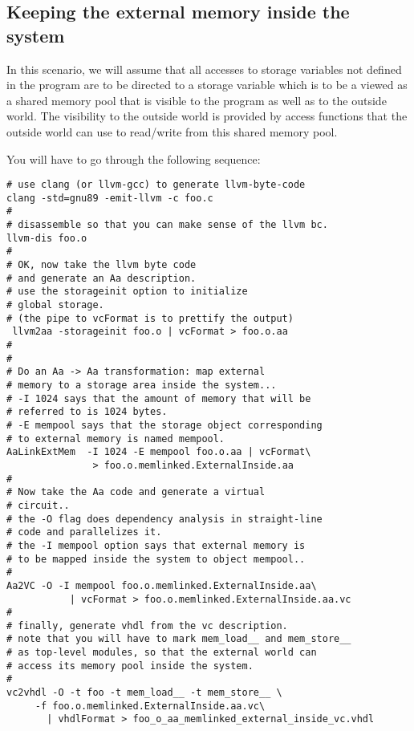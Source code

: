 \subsection{Keeping the external memory inside the system}

In this scenario, we will assume that all accesses to 
storage variables not defined in the \Aa program are 
to be directed to a storage variable which is to be
a viewed as a shared memory pool that is visible to the
\Aa program as well as to the outside world.  The visibility
to the outside world is provided by access functions
that the outside world can use to read/write from this
shared memory pool.

You will have to go through the following sequence:
\begin{verbatim}
# use clang (or llvm-gcc) to generate llvm-byte-code
clang -std=gnu89 -emit-llvm -c foo.c
#
# disassemble so that you can make sense of the llvm bc.
llvm-dis foo.o
#
# OK, now take the llvm byte code
# and generate an Aa description.
# use the storageinit option to initialize
# global storage.
# (the pipe to vcFormat is to prettify the output)
 llvm2aa -storageinit foo.o | vcFormat > foo.o.aa
#
#
# Do an Aa -> Aa transformation: map external
# memory to a storage area inside the system...
# -I 1024 says that the amount of memory that will be
# referred to is 1024 bytes.
# -E mempool says that the storage object corresponding
# to external memory is named mempool.
AaLinkExtMem  -I 1024 -E mempool foo.o.aa | vcFormat\
               > foo.o.memlinked.ExternalInside.aa
#
# Now take the Aa code and generate a virtual
# circuit..
# the -O flag does dependency analysis in straight-line
# code and parallelizes it.
# the -I mempool option says that external memory is
# to be mapped inside the system to object mempool..
#
Aa2VC -O -I mempool foo.o.memlinked.ExternalInside.aa\
           | vcFormat > foo.o.memlinked.ExternalInside.aa.vc
#
# finally, generate vhdl from the vc description.
# note that you will have to mark mem_load__ and mem_store__
# as top-level modules, so that the external world can
# access its memory pool inside the system.
#
vc2vhdl -O -t foo -t mem_load__ -t mem_store__ \ 
     -f foo.o.memlinked.ExternalInside.aa.vc\
       | vhdlFormat > foo_o_aa_memlinked_external_inside_vc.vhdl
\end{verbatim}

